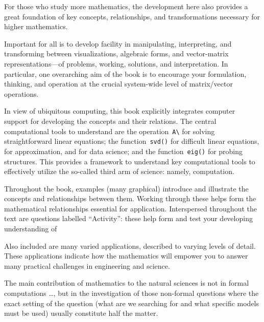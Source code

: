 For those who study more mathematics, the development here also provides a great foundation of key concepts, relationships, and transformations necessary for higher mathematics. 

Important for all is to develop facility in manipulating, interpreting, and transforming between visualizations, algebraic forms, and vector-matrix representations---of problems, working, solutions, and interpretation.
In particular, one overarching aim of the book is to encourage your formulation, thinking, and operation at the crucial system-wide level of matrix\slash vector operations.

In view of ubiquitous computing, this book explicitly integrates computer support for developing the concepts and their relations.
The central computational tools to understand are the operation~\verb|A\| for solving straightforward linear equations; the function~\verb|svd()| for difficult linear equations, for approximation, and for data science; and the function~\verb|eig()| for probing structures.
This provides a framework to understand key computational tools to effectively utilize the so-called third arm of science: namely, computation. 

Throughout the book, examples (many graphical) introduce and illustrate the concepts and relationships between them.
Working through these helps form the mathematical relationships essential for application.
Interspersed throughout the text are questions labelled ``Activity'': these help form and test your developing understanding of 

Also included are many varied applications, described to varying levels of detail.
These applications indicate how the mathematics will empower you to answer many practical challenges in engineering and science.


\begin{quoted}{\cite{Arnold2014}}%
The main contribution of mathematics to the natural sciences is not in formal computations \ldots, but in the investigation of those non-formal questions where the exact setting of the question (what are we searching for and what specific models must be used) usually constitute half the matter.
%
\end{quoted}









